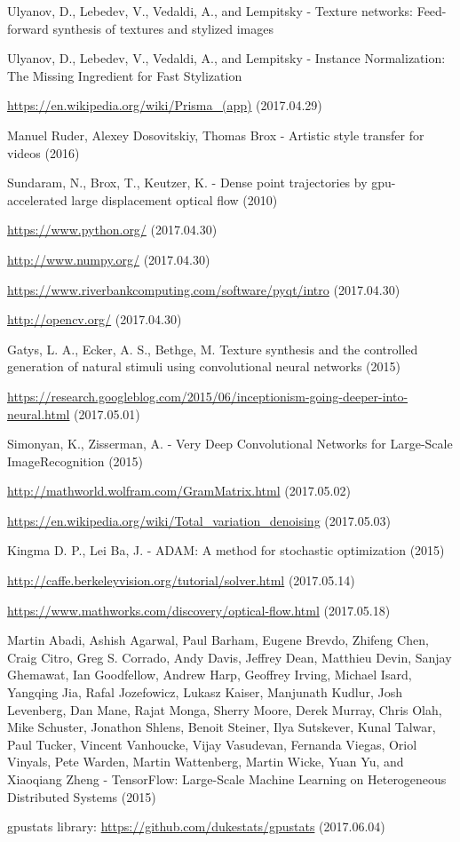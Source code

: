 \documentclass[12pt, a4paper, oneside]{book}
\theoremstyle{tetel}
\begin{document}
\begin{thebibliography}{1}
Ulyanov, D., Lebedev, V., Vedaldi, A., and Lempitsky - Texture networks: Feed-forward synthesis of textures and stylized images

Ulyanov, D., Lebedev, V., Vedaldi, A., and Lempitsky - Instance Normalization: The Missing Ingredient for Fast Stylization

\url{https://en.wikipedia.org/wiki/Prisma_(app)} (2017.04.29)

Manuel Ruder, Alexey Dosovitskiy, Thomas Brox - Artistic style transfer for videos (2016)

Sundaram, N., Brox, T., Keutzer, K. - Dense point trajectories by gpu-accelerated large displacement optical flow (2010)

\url{https://www.python.org/} (2017.04.30)

\url{http://www.numpy.org/} (2017.04.30)

\url{https://www.riverbankcomputing.com/software/pyqt/intro} (2017.04.30)

\url{http://opencv.org/} (2017.04.30)

Gatys, L. A., Ecker, A. S., Bethge, M. Texture synthesis and the controlled generation of natural stimuli using convolutional neural networks (2015)

\url{https://research.googleblog.com/2015/06/inceptionism-going-deeper-into-neural.html} (2017.05.01)

Simonyan, K., Zisserman, A. - Very Deep Convolutional Networks for Large-Scale ImageRecognition (2015)

\url{http://mathworld.wolfram.com/GramMatrix.html} (2017.05.02)

\url{https://en.wikipedia.org/wiki/Total_variation_denoising} (2017.05.03)

Kingma D. P., Lei Ba, J. - ADAM: A method for stochastic optimization (2015)

\url{http://caffe.berkeleyvision.org/tutorial/solver.html} (2017.05.14)

\url{https://www.mathworks.com/discovery/optical-flow.html} (2017.05.18)

Martin Abadi, Ashish Agarwal, Paul Barham, Eugene Brevdo, Zhifeng Chen, Craig Citro, Greg S. Corrado, Andy Davis, Jeffrey Dean, Matthieu Devin, Sanjay Ghemawat, Ian Goodfellow, Andrew Harp, Geoffrey Irving, Michael Isard, Yangqing Jia, Rafal Jozefowicz, Lukasz Kaiser, Manjunath Kudlur, Josh Levenberg, Dan Mane, Rajat Monga, Sherry Moore, Derek Murray, Chris Olah, Mike Schuster, Jonathon Shlens, Benoit Steiner, Ilya Sutskever, Kunal Talwar, Paul Tucker, Vincent Vanhoucke, Vijay Vasudevan, Fernanda Viegas, Oriol Vinyals, Pete Warden, Martin Wattenberg, Martin Wicke, Yuan Yu, and Xiaoqiang Zheng - TensorFlow: Large-Scale Machine Learning on Heterogeneous Distributed Systems (2015)

gpustats library: \url{https://github.com/dukestats/gpustats} (2017.06.04)


\end{thebibliography}
\end{document}
